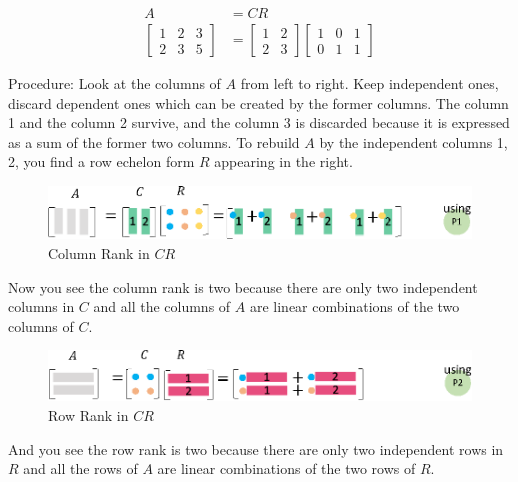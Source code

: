\documentclass[letterpaper]{article}
\begin{document}
\begin{equation*}
  \begin{split}
    A &= CR\\
  \begin{bmatrix}
    1 & 2 & 3 \\
    2 & 3 & 5
  \end{bmatrix}
  & =
  \begin{bmatrix}
    1 & 2 \\
    2 & 3
  \end{bmatrix}
  \begin{bmatrix}
    1 & 0 & 1 \\
    0 & 1 & 1
  \end{bmatrix}
\end{split}
\end{equation*}

Procedure: Look at the columns of $A$ from left to right. Keep independent ones,
discard dependent ones which can be created by the former columns.
The column 1 and the column 2 survive, and the column 3 is discarded
because it is expressed as a sum of the former two columns.
To rebuild $A$ by the independent columns 1, 2, you find a row echelon form $R$
appearing in the right.

\begin{figure}[H]
  \includegraphics[keepaspectratio, width=\linewidth]{CR1.eps}
  \caption{Column Rank in $CR$}
\end{figure}

Now you see the column rank is two because there are only two independent columns in $C$
and all the columns of $A$ are linear combinations of the two columns of $C$.

\begin{figure}[H]
  \includegraphics[keepaspectratio, width=\linewidth]{CR2.eps}
  \caption{Row Rank in $CR$}
\end{figure}

And you see the row rank is two because there are only two independent rows in $R$
and all the rows of $A$ are linear combinations of the two rows of $R$.
\end{document}
